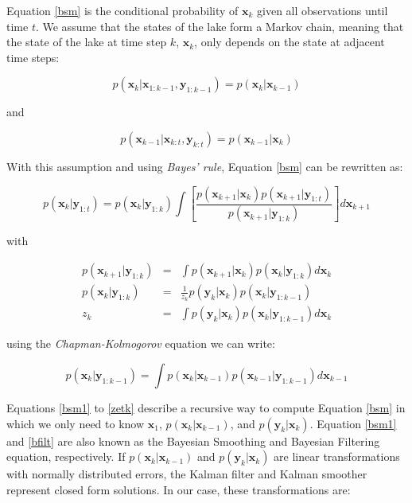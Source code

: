\documentclass[doublespacing, linenumbers]{bmcart}
\newcommand{\bm}[1]{{\textbf{#1}}}
\begin{document}
Equation \ref{bsm} is the conditional probability of $\bm{x}_k$ given all
observations until time $t$. We assume that the states of the lake form a
Markov chain, meaning that the state of the lake at time step $k$, $\bm{x}_k$,
only depends on the state at adjacent time steps:

\begin{equation}\label{markov1}
    p(\bm{x}_k|\bm{x}_{1:k-1}, \bm{y}_{1:k-1}) = p(\bm{x}_k|\bm{x}_{k-1})
\end{equation}

and

\begin{equation}\label{markov2}
    p(\bm{x}_{k-1}|\bm{x}_{k:t}, \bm{y}_{k:t}) = p(\bm{x}_{k-1}|\bm{x}_{k})
\end{equation}

With this assumption and using \textit{Bayes' rule}, Equation \ref{bsm} can be
rewritten \cite{sarkkaBayesianFilteringSmoothing2013} as:

\begin{equation}\label{bsm1}
p(\bm{x}_k|\bm{y}_{1:t}) = p(\bm{x}_k|\bm{y}_{1:k})
    \int\left[\frac{p(\bm{x}_{k+1}|\bm{x}_k)p(\bm{x}_{k+1}|\bm{y}_{1:t})}{p(\bm{x}_{k+1}|\bm{y}_{1:k})}\right]d\bm{x}_{k+1}
\end{equation}

with

\begin{eqnarray}\label{bfilt1}
p(\bm{x}_{k+1}|\bm{y}_{1:k}) & = & \int p(\bm{x}_{k+1}|\bm{x}_k)p(\bm{x}_k|\bm{y}_{1:k})d\bm{x}_k \\
        \label{bfilt}
    p(\bm{x}_k|\bm{y}_{1:k}) & = & \frac{1}{z_k} p(\bm{y}_k|\bm{x}_k)p(\bm{x}_k|\bm{y}_{1:k-1}) \\
        \label{zetk}
    z_k & = & \int p(\bm{y}_k|\bm{x}_k) p(\bm{x}_k| \bm{y}_{1:k-1}) d\bm{x}_k  
\end{eqnarray}

using the \textit{Chapman-Kolmogorov} equation
\cite{sarkkaBayesianFilteringSmoothing2013} we can write:

\begin{equation}
p(\bm{x}_k|\bm{y}_{1:k-1}) = \int p(\bm{x}_k|\bm{x}_{k-1})p(\bm{x}_{k-1}|\bm{y}_{1:k-1})d\bm{x}_{k-1} 
\end{equation}

Equations \ref{bsm1} to \ref{zetk} describe a recursive way to compute Equation
\ref{bsm} in which we only need to know $\bm{x}_1$, $p(\bm{x}_k|\bm{x}_{k-1})$,
and $p(\bm{y}_k|\bm{x}_k)$. Equation \ref{bsm1} and \ref{bfilt} are also known
as the Bayesian Smoothing and Bayesian Filtering equation, respectively. If
$p(\bm{x}_k|\bm{x}_{k-1})$ and $p(\bm{y}_k|\bm{x}_k)$ are linear transformations
with normally distributed errors, the Kalman filter \cite{Kalman1960} and Kalman
smoother \cite{Rauch1965} represent closed form solutions. In our case, these
transformations are:
\end{document}
